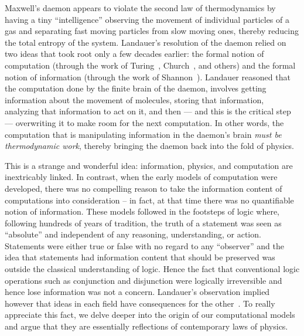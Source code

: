 \documentclass{article}
\begin{document}
Maxwell's daemon appears to violate the second law of thermodynamics by
having a tiny ``intelligence'' observing the movement of individual
particles of a gas and separating fast moving particles from slow
moving ones, thereby reducing the total entropy of the
system. Landauer's resolution of the daemon relied on two ideas that
took root only a few decades earlier: the formal notion of computation
(through the work of Turing~\cite{turing}, Church~\cite{church51}, and
others) and the formal notion of information (through the work of
Shannon~\cite{shannon1948}). Landauer reasoned that the computation
done by the finite brain of the daemon, involves getting information
about the movement of molecules, storing that information, analyzing
that information to act on it, and then --- and this is the critical
step --- overwriting it to make room for the next computation.  In
other words, the computation that is manipulating information in the
daemon's brain \textit{must be thermodynamic work}, thereby bringing
the daemon back into the fold of physics.

This is a strange and wonderful idea: information, physics, and
computation are inextricably linked. In contrast, when the early
models of computation were developed, there was no compelling reason
to take the information content of computations into consideration
-- in fact, at that time there was no quantifiable notion of
information. These models followed in the footsteps of logic where,
following hundreds of years of tradition, the truth of a statement was
seen as ``absolute'' and independent of any reasoning, understanding,
or action. Statements were either true or false with no regard to any
``observer'' and the idea that statements had information content that
should be preserved was outside the classical understanding of
logic. Hence the fact that conventional logic operations such as
conjunction and disjunction were logically irreversible and hence lose
information was not a concern. Landauer's observation implied however
that ideas in each field have consequences for the
other~\cite{bennett:1973:lrc,bennett1985fundamental,bennett2010notes,bennett2003notes,Baker:1992:NFT,baez2011physics,dblp:conf/csfw/malacarias12}. To
really appreciate this fact, we delve deeper into the origin of our
computational models and argue that they are essentially reflections
of contemporary laws of physics.

\end{document}
